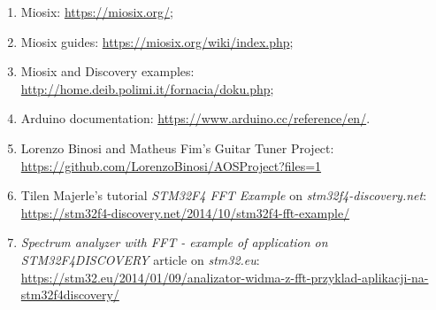 \begin{enumerate}
	\item Miosix: \href{https://miosix.org/}{https://miosix.org/};
	\item Miosix guides: \href{https://miosix.org/wiki/index.php}{https://miosix.org/wiki/index.php};
	\item Miosix and Discovery examples: \href{http://home.deib.polimi.it/fornacia/doku.php}{http://home.deib.polimi.it/fornacia/doku.php};
	\item Arduino documentation: \href{https://www.arduino.cc/reference/en/}{https://www.arduino.cc/reference/en/}.
	\item Lorenzo Binosi and Matheus Fim's Guitar Tuner Project: \\
	\href{https://github.com/LorenzoBinosi/AOSProject?files=1}{https://github.com/LorenzoBinosi/AOSProject?files=1}
	\item Tilen Majerle's tutorial \textit{STM32F4 FFT Example} on \textit{stm32f4-discovery.net}: \\
	\href{https://stm32f4-discovery.net/2014/10/stm32f4-fft-example/}{https://stm32f4-discovery.net/2014/10/stm32f4-fft-example/}
	\item \textit{Spectrum analyzer with FFT - example of application on STM32F4DISCOVERY} article on \textit{stm32.eu}:
	\href{https://stm32.eu/2014/01/09/analizator-widma-z-fft-przyklad-aplikacji-na-stm32f4discovery/}{https://stm32.eu/2014/01/09/analizator-widma-z-fft-przyklad-aplikacji-na-stm32f4discovery/}
\end{enumerate}